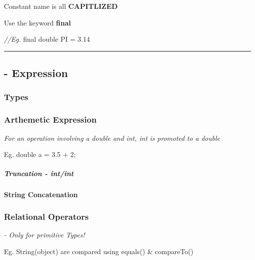 \documentclass[
  paper=a4,
  ,captions=tableheading
]{scrartcl}
\newenvironment{Shaded}{}{}
\newcommand{\CommentTok}[1]{\textcolor[rgb]{0.38,0.63,0.69}{\textit{#1}}}
\newcommand{\DataTypeTok}[1]{\textcolor[rgb]{0.56,0.13,0.00}{#1}}
\newcommand{\FloatTok}[1]{\textcolor[rgb]{0.25,0.63,0.44}{#1}}
\newcommand{\NormalTok}[1]{#1}
\begin{document}
Constant name is all \textbf{CAPITLIZED}

Use the keyword \textbf{final}

\begin{Shaded}
\begin{Highlighting}[]
\CommentTok{//Eg. }
\DataTypeTok{final} \DataTypeTok{double}\NormalTok{ PI = }\FloatTok{3.14}
\end{Highlighting}
\end{Shaded}

\begin{center}\rule{0.5\linewidth}{\linethickness}\end{center}

\hypertarget{expression}{%
\subsection{- Expression}\label{expression}}

\hypertarget{types-1}{%
\subsubsection{Types}\label{types-1}}

\hypertarget{arthemetic-expression}{%
\subsubsection{Arthemetic Expression}\label{arthemetic-expression}}

\emph{For an operation involving a double and int, int is promoted to a
double}

Eg. double a = 3.5 + 2;

\hypertarget{truncation---intint}{%
\subparagraph{Truncation - int/int}\label{truncation---intint}}

\hypertarget{string-concatenation}{%
\paragraph{String Concatenation}\label{string-concatenation}}

\hypertarget{relational-operators}{%
\subsubsection{Relational Operators}\label{relational-operators}}

\emph{- Only for primitive Types!}

Eg. String(object) are compared using equals() \& compareTo()
\end{document}
